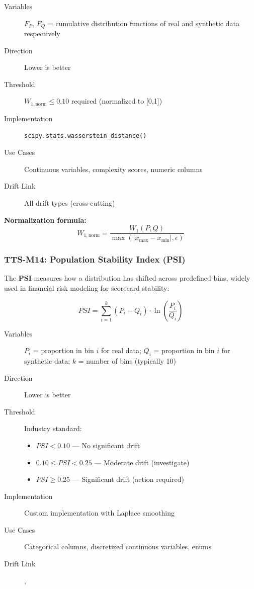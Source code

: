 \begin{description}
  \item[Variables] $F_P$, $F_Q$ = cumulative distribution functions of real and
        synthetic data respectively
  \item[Direction] Lower is better
  \item[Threshold] $W_{1,\text{norm}} \leq 0.10$ required (normalized to [0,1])
  \item[Implementation] \texttt{scipy.stats.wasserstein\_distance()}
  \item[Use Cases] Continuous variables, complexity scores, numeric columns
  \item[Drift Link] All drift types (cross-cutting)
\end{description}

\textbf{Normalization formula:}
\begin{equation}
W_{1,\text{norm}} = \frac{W_1(P, Q)}{\max(|x_{\max} - x_{\min}|, \epsilon)}
\end{equation}

\subsubsection{TTS-M14: Population Stability Index (PSI)}

The \textbf{PSI} measures how a distribution has shifted across predefined
bins, widely used in financial risk modeling for scorecard stability:

\begin{equation}
\boxed{
PSI = \sum_{i=1}^{k} (P_i - Q_i) \cdot \ln\left(\frac{P_i}{Q_i}\right)
}
\end{equation}

\begin{description}
  \item[Variables] $P_i$ = proportion in bin $i$ for real data;
        $Q_i$ = proportion in bin $i$ for synthetic data;
        $k$ = number of bins (typically 10)
  \item[Direction] Lower is better
  \item[Threshold] Industry standard:
    \begin{itemize}
      \item $PSI < 0.10$ --- No significant drift
      \item $0.10 \leq PSI < 0.25$ --- Moderate drift (investigate)
      \item $PSI \geq 0.25$ --- Significant drift (action required)
    \end{itemize}
  \item[Implementation] Custom implementation with Laplace smoothing
  \item[Use Cases] Categorical columns, discretized continuous variables, enums
  \item[Drift Link] , 
\end{description}

